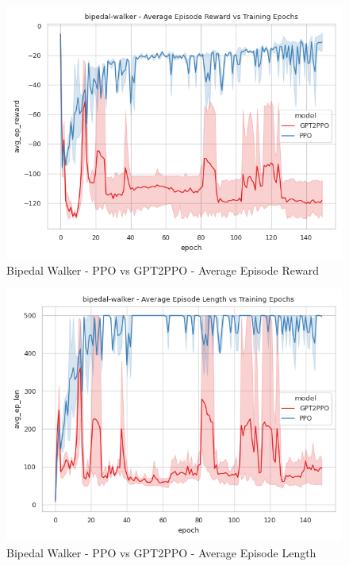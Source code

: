 \begin{figure}[htbp]
    \centerline{\includegraphics[width=\columnwidth]{./img/bipedal-walker-avg_ep_reward-model.png}}
    \caption{Bipedal Walker - PPO vs GPT2PPO - Average Episode Reward}
    \label{bipedal-walker-avg_ep_reward-model}
\end{figure}

\begin{figure}[htbp]
    \centerline{\includegraphics[width=\columnwidth]{./img/bipedal-walker-avg_ep_len-model.png}}
    \caption{Bipedal Walker - PPO vs GPT2PPO - Average Episode Length}
    \label{bipedal-walker-avg_ep_len-model}
\end{figure}

